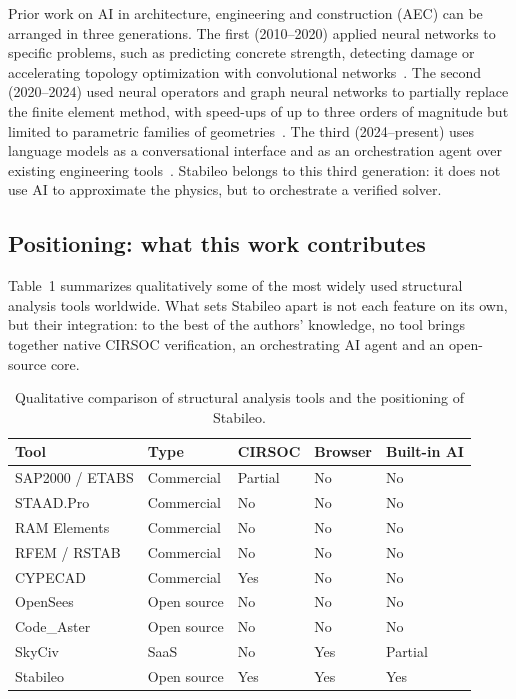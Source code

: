 \documentclass[11pt,a4paper]{article}
\begin{document}
Prior work on AI in architecture, engineering and construction (AEC) can be arranged in three generations. The first (2010–2020) applied neural networks to specific problems, such as predicting concrete strength, detecting damage or accelerating topology optimization with convolutional networks~\cite{ref15}. The second (2020–2024) used neural operators and graph neural networks to partially replace the finite element method, with speed-ups of up to three orders of magnitude but limited to parametric families of geometries~\cite{ref16,ref17}. The third (2024–present) uses language models as a conversational interface and as an orchestration agent over existing engineering tools~\cite{ref4,ref5}. Stabileo belongs to this third generation: it does not use AI to approximate the physics, but to orchestrate a verified solver.

\subsection{Positioning: what this work contributes}\label{sec:2.4}

Table~1 summarizes qualitatively some of the most widely used structural analysis tools worldwide. What sets Stabileo apart is not each feature on its own, but their integration: to the best of the authors' knowledge, no tool brings together native CIRSOC verification, an orchestrating AI agent and an open-source core.

\begin{table}[htbp]
  \centering\small
  \caption{Qualitative comparison of structural analysis tools and the positioning of Stabileo.}\label{tab:1}
  \begin{tabular}{lllll}
    \toprule
    \textbf{Tool} & \textbf{Type} & \textbf{CIRSOC} & \textbf{Browser} & \textbf{Built-in AI} \\
    \midrule
    SAP2000 / ETABS & Commercial & Partial & No & No \\
    STAAD.Pro & Commercial & No & No & No \\
    RAM Elements & Commercial & No & No & No \\
    RFEM / RSTAB & Commercial & No & No & No \\
    CYPECAD & Commercial & Yes & No & No \\
    OpenSees & Open source & No & No & No \\
    Code\_Aster & Open source & No & No & No \\
    SkyCiv & SaaS & No & Yes & Partial \\
    Stabileo & Open source & Yes & Yes & Yes \\
    \bottomrule
  \end{tabular}
\end{table}
\end{document}
